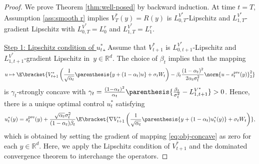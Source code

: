 \documentclass{article}
\newcommand{\R}{\mathbb{R}}
\begin{document}
\begin{proof}
We prove Theorem \ref{thm:well-posed} by backward induction. At time $t = T$, Assumption \ref{ass:smooth r} implies $V_T^*(y) = R(y)$ is $L_{0, T}^{V^*}$-Lipschitz and $L_{1, T}^{V^*}$-gradient Lipschitz with $L_{0, T}^{V^*} = L_0^r$ and $L_{1, T}^{V^*} = L_1^r$.

\underline{Step 1: Lipschitz condition of $ u_{t}^{*} $.} Assume that $V^*_{t+1}$ is $L_{0, t+1}^{V^*}$-Lipschitz and $L_{1, t+1}^{V^*}$-gradient Lipschitz in~$y\in \R^d$. The choice of $\beta_t$ implies that the mapping
\begin{eqnarray}\label{eq:obj-concave}
    u \mapsto \E\bracket{V^{*}_{t+1}\left(\frac{1}{\sqrt{\alpha_t}}\parenthesis{y + (1 - \alpha_t)u} + \sigma_t W_t\right) - \beta_t \frac{(1 - \alpha_{t})^{2}}{2\alpha_{t}\sigma_{t}^{2}}\norm{u - s^{\rm pre}_{t}(y)}_{2}^{2}}
\end{eqnarray}
is $\gamma_t$-strongly concave with $ \gamma_{t} = \frac{(1 - \alpha_{t})^{2}}{\alpha_{t}}\parenthesis{\frac{\beta_{t}}{\sigma_{t}^{2}} - L_{1, t+1}^{V^{*}}} > 0 $. Hence, there is a unique optimal control $u_t^*$ satisfying
\begin{eqnarray}\label{eq:u*(y)-re}
     u_{t}^{*}(y)  = s_{t}^{\rm pre}(y) + \frac{\sqrt{\alpha_{t}}\sigma_{t}^{2}}{(1 - \alpha_{t})\beta_t}\E\bracket{\nabla V_{t+1}^{*}\left(\frac{1}{\sqrt{\alpha_t}}\parenthesis{y + (1 - \alpha_t)u_t^*(y)} + \sigma_t W_t\right)},
\end{eqnarray}
which is obtained by setting the gradient of mapping \eqref{eq:obj-concave} as zero for each $y \in \R^d$.
Here, we apply the Lipschitz condition of $V_{t+1}^*$ and the dominated convergence theorem to interchange the operators. 


\end{proof}
\end{document}
